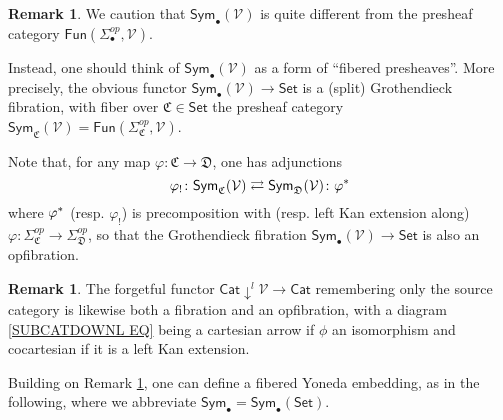 \documentclass[a4paper,10pt
,draft
]{article}%
\numberwithin{equation}{section}
\numberwithin{figure}{section}
\theoremstyle{definition} %
\newtheorem{remark}[equation]{Remark}%
\newcommand{\Sym}{\ensuremath{\mathsf{Sym}}}%
\newcommand{\V}{\ensuremath{\mathcal V}}
\newcommand{\1}{\ensuremath{\mathbbm 1}}%
\begin{document}
\begin{remark}\label{COLCHADJ REM}
	We caution that 
	$\mathsf{Sym}_{\bullet}(\V)$
	is quite different from the presheaf category 
	$\mathsf{Fun}(\Sigma_{\bullet}^{op},\V)$.

	Instead, one should think of 
	$\mathsf{Sym}_{\bullet}(\V)$
	as a form of ``fibered presheaves''.
	More precisely,
        the obvious functor
        $\mathsf{Sym}_{\bullet}(\V) \to \mathsf{Set}$
        is a (split) Grothendieck fibration,
	with fiber over 
	$\mathfrak{C} \in \mathsf{Set}$
	the presheaf category
	$\Sym_{\mathfrak C}(\V)=
	\mathsf{Fun}(\Sigma_{\mathfrak{C}}^{op},\mathcal{V})$.

	Note that,
	for any map $\varphi \colon \mathfrak{C} \to \mathfrak{D}$,
	one has adjunctions
	\begin{equation}\label{COLCHADJ EQ}
	\varphi_! \colon \Sym_{\mathfrak C}(\V) 
	\rightleftarrows 
	\Sym_{\mathfrak D}(\V) \colon \varphi^{\**}
	\end{equation}
	where $\varphi^{\**}$
	(resp. $\varphi_!$)
	is precomposition with (resp. left Kan extension along)
	$\varphi\colon 
	\Sigma^{op}_{\mathfrak{C}}
	\to 
	\Sigma^{op}_{\mathfrak{D}}$,
	so that the Grothendieck fibration
	$\mathsf{Sym}_{\bullet}(\V) \to \mathsf{Set}$
	is also an opfibration. 
\end{remark}


\begin{remark}\label{SUBCOCART REM}
	The forgetful functor $\mathsf{Cat} \downarrow^l \mathcal{V} \to \mathsf{Cat}$
	remembering only the source category is likewise both a fibration and an opfibration, 
	with a diagram \eqref{SUBCATDOWNL EQ}
	being a cartesian arrow if  $\phi$ an isomorphism
	and cocartesian if it is a left Kan extension. 
\end{remark}


Building on Remark \ref{COLCHADJ REM},
one can define a fibered Yoneda embedding, as in the following,
where we abbreviate
$\mathsf{Sym}_{\bullet} = \mathsf{Sym}_{\bullet}(\mathsf{Set})$.
\end{document}
